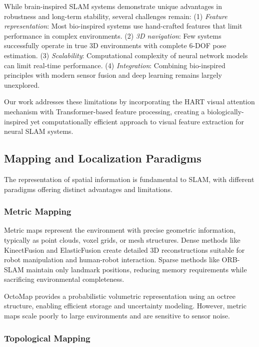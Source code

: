 While brain-inspired SLAM systems demonstrate unique advantages in robustness and long-term stability, several challenges remain:
(1) \textit{Feature representation}: Most bio-inspired systems use hand-crafted features that limit performance in complex environments.
(2) \textit{3D navigation}: Few systems successfully operate in true 3D environments with complete 6-DOF pose estimation.
(3) \textit{Scalability}: Computational complexity of neural network models can limit real-time performance.
(4) \textit{Integration}: Combining bio-inspired principles with modern sensor fusion and deep learning remains largely unexplored.

Our work addresses these limitations by incorporating the HART visual attention mechanism with Transformer-based feature processing, creating a biologically-inspired yet computationally efficient approach to visual feature extraction for neural SLAM systems.


\subsection{Mapping and Localization Paradigms}

The representation of spatial information is fundamental to SLAM, with different paradigms offering distinct advantages and limitations.

\subsubsection{Metric Mapping}

Metric maps represent the environment with precise geometric information, typically as point clouds, voxel grids, or mesh structures.
Dense methods like KinectFusion \cite{Newcombe2011} and ElasticFusion \cite{Whelan2016} create detailed 3D reconstructions suitable for robot manipulation and human-robot interaction.
Sparse methods like ORB-SLAM \cite{MurArtal2015} maintain only landmark positions, reducing memory requirements while sacrificing environmental completeness.

OctoMap \cite{Hornung2013} provides a probabilistic volumetric representation using an octree structure, enabling efficient storage and uncertainty modeling.
However, metric maps scale poorly to large environments and are sensitive to sensor noise.

\subsubsection{Topological Mapping}

